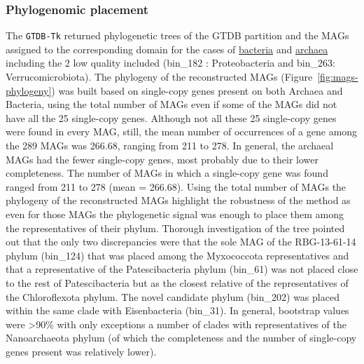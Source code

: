 \subsubsection*{Phylogenomic placement}

   The \texttt{GTDB-Tk} returned phylogenetic trees of the GTDB partition and the MAGs assigned to the corresponding domain for the 
   cases of \href{https://github.com/hariszaf/karpathos-swamp/blob/main/GTDB_TK_bins_classification/elos_70_5.bac120.classify.tree}{bacteria} 
   and \href{https://github.com/hariszaf/karpathos-swamp/blob/main/GTDB_TK_bins_classification/elos_70_5.ar122.classify.tree}{archaea} 
   including the 2 low quality included (bin\_182 : Proteobacteria and bin\_263: Verrucomicrobiota). 
   The phylogeny of the reconstructed MAGs (Figure~\ref{fig:mags-phylogeny}) was built based on single-copy genes present on both Archaea and Bacteria, using the total number of MAGs 
   even if some of the MAGs did not have all the 25 single-copy genes. 
   Although not all these 25 single-copy genes were found in every MAG, still, the mean number of occurrences of a gene among the 289 MAGs was 266.68, ranging from 211 to 278. 
   In general, the archaeal MAGs had the fewer single-copy genes, most probably due to their lower completeness. 
   The number of MAGs in which a single-copy gene was found  ranged from 211 to 278 (mean = 266.68). 
   Using the total number of MAGs the phylogeny of the reconstructed MAGs highlight the robustness of the method as even for those MAGs the phylogenetic signal was enough to place 
   them among the representatives of their phylum. 
   Thorough investigation of the tree pointed out that the only two discrepancies were that the sole MAG of the RBG-13-61-14 phylum (bin\_124) that was placed among the 
   Myxococcota representatives and that a representative of the Patescibacteria phylum (bin\_61) was not placed close to the rest of Patescibacteria but as the closest relative of 
   the representatives of the Chloroflexota phylum. 
   The novel candidate phylum (bin\_202) was placed within the same clade with Eisenbacteria (bin\_31). 
   In general, bootstrap values were >90\% with only exceptions a number of clades with representatives of the Nanoarchaeota phylum 
   (of which the completeness and the number of single-copy genes present was relatively lower). 

